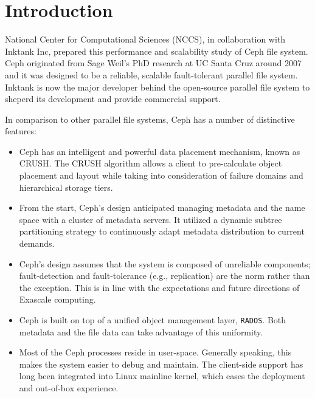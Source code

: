 \section{Introduction}

National Center for Computational Sciences (NCCS), in collaboration with
Inktank Inc, prepared this performance and scalability study of
Ceph file system. Ceph originated from Sage Weil's PhD research
at UC Santa Cruz around 2007 and it was designed to be a reliable, scalable
fault-tolerant parallel file system. Inktank is now the major developer behind
the open-source parallel file system to sheperd its development and provide
commercial support.

In comparison to other parallel file systems, Ceph has a number of distinctive
features:

\begin{itemize}
 
\item Ceph has an intelligent and powerful data placement mechanism, known as
  CRUSH. The CRUSH algorithm allows a client to pre-calculate object
  placement and layout while taking into consideration of failure domains and
  hierarchical storage tiers.
  
\item From the start, Ceph's design anticipated managing metadata and the name space
  with a cluster of metadata servers. It utilized a dynamic subtree partitioning
  strategy to continuously adapt metadata distribution to current demands.

\item Ceph's design assumes that the system is composed of unreliable
components; fault-detection and fault-tolerance (e.g., replication) are the
norm rather than the exception. This is in line with the expectations and
future directions of Exascale computing.

\item Ceph is built on top of a unified object management layer,
\texttt{RADOS}. Both metadata and the file data can take advantage of this
uniformity.

\item Most of the Ceph processes reside in user-space. Generally speaking, this makes the
system easier to debug and maintain. The client-side support has long been
integrated into Linux mainline kernel, which eases the deployment and out-of-box
experience.

\end{itemize}


